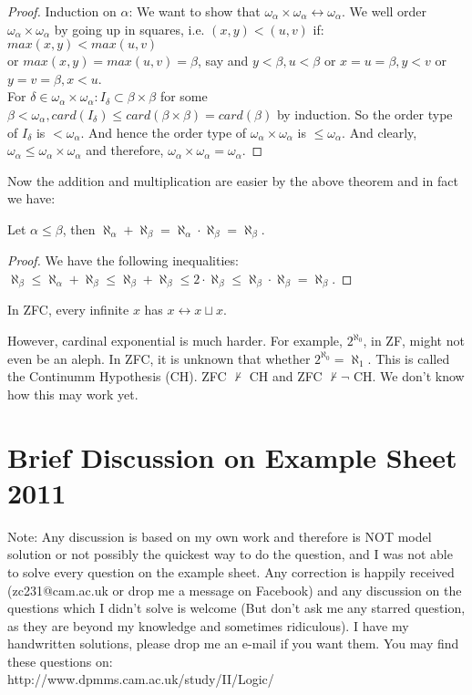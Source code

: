 \begin{proof} Induction on $\alpha$: We want to show that $\omega_\alpha \times \omega_\alpha \leftrightarrow \omega_\alpha$. We well order $\omega_\alpha \times \omega_\alpha$ by going up in squares, i.e. $(x,y)<(u,v)$ if:\\
$max(x,y)<max(u,v)$\\
or $max(x,y)=max(u,v)=\beta$, say and $y<\beta, u<\beta$ or $x=u=\beta, y<v$ or $y=v=\beta, x<u$.\\
For $\delta \in \omega_\alpha \times \omega_\alpha: I_\delta \subset \beta \times \beta$ for some $\beta < \omega_\alpha, card(I_\delta) \le card(\beta \times \beta)=card(\beta)$ by induction. So the order type of $I_\delta$ is $< \omega_\alpha$. And hence the order type of $\omega_\alpha \times \omega_\alpha$ is $\le \omega_\alpha$. And clearly, $\omega_\alpha \le \omega_\alpha \times \omega_\alpha$ and therefore, $\omega_\alpha \times \omega_\alpha = \omega_\alpha$.
\end{proof}
Now the addition and multiplication are easier by the above theorem and in fact we have:
\begin{corollary} Let $\alpha \le \beta$, then $\aleph_\alpha + \aleph_\beta = \aleph_\alpha \cdot \aleph_\beta = \aleph_\beta$.
\end{corollary}
\begin{proof} We have the following inequalities:\\
$\aleph_\beta \le \aleph_\alpha+\aleph_\beta \le \aleph_\beta +\aleph_\beta \le 2 \cdot \aleph_\beta \le \aleph_\beta \cdot \aleph_\beta = \aleph_\beta$.
\end{proof}
\begin{example} In ZFC, every infinite $x$ has $x \leftrightarrow x \sqcup x$.
\end{example}
However, cardinal exponential is much harder. For example, $2^{\aleph_0}$, in ZF, might not even be an aleph. In ZFC, it is unknown that whether $2^{\aleph_0}=\aleph_1$. This is called the Continumm Hypothesis (CH). ZFC $\not \vdash$ CH and ZFC $\not \vdash \neg$ CH. We don't know how this may work yet.
\section{Brief Discussion on Example Sheet 2011}
Note: Any discussion is based on my own work and therefore is NOT model solution or not possibly the quickest way to do the question, and I was not able to solve every question on the example sheet. Any correction is happily received (zc231@cam.ac.uk or drop me a message on Facebook) and any discussion on the questions which I didn't solve is welcome (But don't ask me any starred question, as they are beyond my knowledge and sometimes ridiculous). I have my handwritten solutions, please drop me an e-mail if you want them. You may find these questions on:\\
http://www.dpmms.cam.ac.uk/study/II/Logic/
